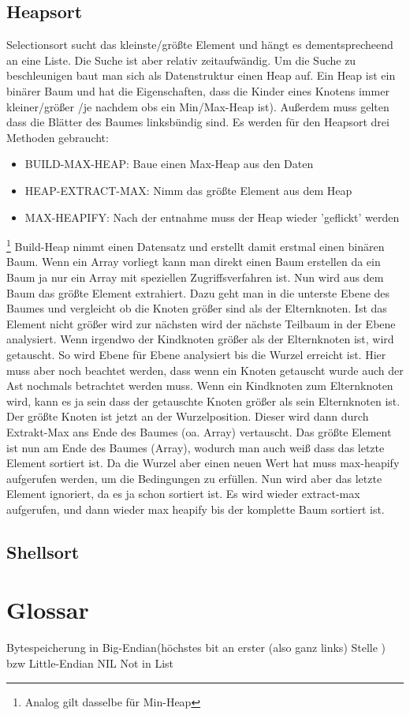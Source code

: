 \documentclass[a4paper]{scrartcl}
\begin{document}
        \subsection{Heapsort}
            Selectionsort sucht das kleinste/größte Element und hängt es dementsprecheend an eine Liste. Die Suche ist aber relativ zeitaufwändig. Um die 
            Suche zu beschleunigen baut man sich als Datenstruktur einen Heap auf. Ein Heap ist ein binärer Baum und hat die Eigenschaften, dass die Kinder 
            eines Knotens immer kleiner/größer /je nachdem obs ein Min/Max-Heap ist). Außerdem muss gelten dass die Blätter des Baumes linksbündig sind.
            Es werden für den Heapsort drei Methoden gebraucht:
            \begin{itemize}
                \item BUILD-MAX-HEAP: Baue einen Max-Heap aus den Daten
                \item HEAP-EXTRACT-MAX: Nimm das größte Element aus dem Heap
                \item MAX-HEAPIFY: Nach der entnahme muss der Heap wieder 'geflickt' werden
            \end{itemize} \footnote{Analog gilt dasselbe für Min-Heap}
            Build-Heap nimmt einen Datensatz und erstellt damit erstmal einen binären Baum. Wenn ein Array vorliegt kann man direkt einen Baum erstellen
            da ein Baum ja nur ein Array mit speziellen Zugriffsverfahren ist. Nun wird aus dem Baum das größte Element extrahiert. Dazu geht man in die unterste Ebene
            des Baumes und vergleicht ob die Knoten größer sind als der Elternknoten. Ist das Element nicht größer wird zur nächsten wird der nächste Teilbaum in der Ebene
            analysiert. Wenn irgendwo der Kindknoten größer als der Elternknoten ist, wird getauscht. So wird Ebene für Ebene analysiert bis die Wurzel erreicht ist. Hier muss
            aber noch beachtet werden, dass wenn ein Knoten getauscht wurde auch der Ast nochmals betrachtet werden muss. Wenn ein Kindknoten zum Elternknoten wird, kann
            es ja sein dass der getauschte Knoten größer als sein Elternknoten ist. Der größte Knoten ist jetzt an der Wurzelposition. Dieser wird dann durch Extrakt-Max
            ans Ende des Baumes (oa. Array) vertauscht. Das größte Element ist nun am Ende des Baumes (Array), wodurch man auch weiß dass das letzte Element sortiert ist.
            Da die Wurzel aber einen neuen Wert hat muss max-heapify aufgerufen werden, um die Bedingungen zu erfüllen. Nun wird aber das letzte Element ignoriert, da es ja
            schon sortiert ist. Es wird wieder extract-max aufgerufen, und dann wieder max heapify bis der komplette Baum sortiert ist.
        \subsection{Shellsort}
    \section{Glossar}
        Bytespeicherung in Big-Endian(höchstes bit an erster (also  ganz links) Stelle ) bzw Little-Endian
        NIL Not in List
\end{document}
